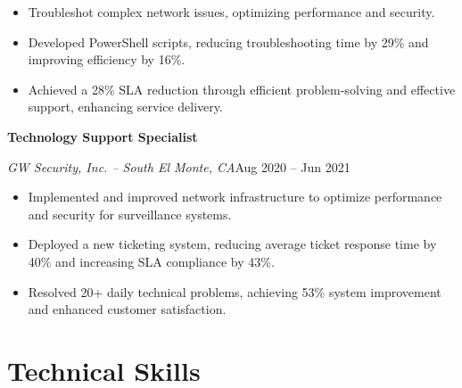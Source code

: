 \documentclass[a4paper]{article}
\begin{document}
\begin{minipage}[t]{0.62\textwidth}
    \begin{itemize}[noitemsep,nolistsep]
        \item Troubleshot complex network issues, optimizing performance and security.
        \item Developed PowerShell scripts, reducing troubleshooting time by 29\% and improving efficiency by 16\%.
        \item Achieved a 28\% SLA reduction through efficient problem-solving and effective support, enhancing service delivery.
    \end{itemize}

    \vspace{0.5em}
    \textbf{Technology Support Specialist}\par
    \textit{GW Security, Inc. -- South El Monte, CA}\hfill Aug 2020 -- Jun 2021

    \begin{itemize}[noitemsep,nolistsep]
        \item Implemented and improved network infrastructure to optimize performance and security for surveillance systems.
        \item Deployed a new ticketing system, reducing average ticket response time by 40\% and increasing SLA compliance by 43\%.
        \item Resolved 20+ daily technical problems, achieving 53\% system improvement and enhanced customer satisfaction.
    \end{itemize}

    \section{Technical Skills}
    \begin{itemize}
        \apptechnicalskills{}
    \end{itemize}
\end{minipage}
\end{document}
